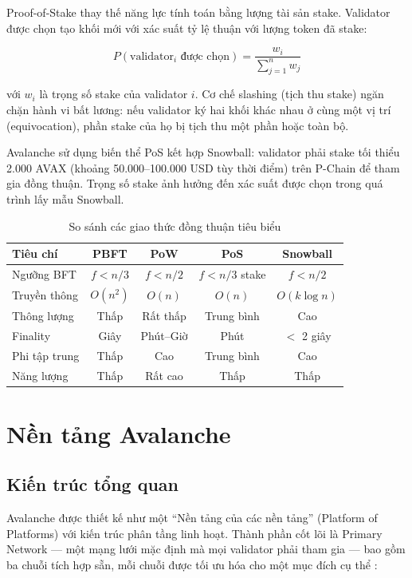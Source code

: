 Proof-of-Stake thay thế năng lực tính toán bằng lượng tài sản stake. Validator được chọn tạo khối mới với xác suất tỷ lệ thuận với lượng token đã stake:

\begin{equation}
P(\text{validator}_i \text{ được chọn}) = \frac{w_i}{\sum_{j=1}^{n} w_j}
\end{equation}

với $w_i$ là trọng số stake của validator $i$. Cơ chế slashing (tịch thu stake) ngăn chặn hành vi bất lương: nếu validator ký hai khối khác nhau ở cùng một vị trí (equivocation), phần stake của họ bị tịch thu một phần hoặc toàn bộ.

Avalanche sử dụng biến thể PoS kết hợp Snowball: validator phải stake tối thiểu 2.000 AVAX (khoảng 50.000--100.000 USD tùy thời điểm) trên P-Chain để tham gia đồng thuận. Trọng số stake ảnh hưởng đến xác suất được chọn trong quá trình lấy mẫu Snowball.

\begin{table}[H]
\centering
\caption{So sánh các giao thức đồng thuận tiêu biểu}
\label{tab:consensus_comparison}
\begin{tabular}{|l|c|c|c|c|}
\hline
\textbf{Tiêu chí} & \textbf{PBFT} & \textbf{PoW} & \textbf{PoS} & \textbf{Snowball} \\ \hline
Ngưỡng BFT & $f < n/3$ & $f < n/2$ & $f < n/3$ stake & $f < n/2$ \\ \hline
Truyền thông & $O(n^2)$ & $O(n)$ & $O(n)$ & $O(k\log n)$ \\ \hline
Thông lượng & Thấp & Rất thấp & Trung bình & Cao \\ \hline
Finality & Giây & Phút--Giờ & Phút & $<$ 2 giây \\ \hline
Phi tập trung & Thấp & Cao & Trung bình & Cao \\ \hline
Năng lượng & Thấp & Rất cao & Thấp & Thấp \\ \hline
\end{tabular}
\end{table}


\section{Nền tảng Avalanche}

\subsection{Kiến trúc tổng quan}

Avalanche được thiết kế như một ``Nền tảng của các nền tảng'' (Platform of Platforms) với kiến trúc phân tầng linh hoạt. Thành phần cốt lõi là Primary Network --- một mạng lưới mặc định mà mọi validator phải tham gia --- bao gồm ba chuỗi tích hợp sẵn, mỗi chuỗi được tối ưu hóa cho một mục đích cụ thể \cite{avalabs2023docs}:

